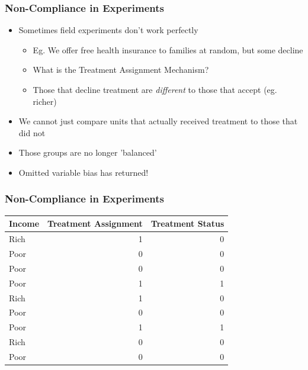 \documentclass[xcolor=x11names,compress]{beamer}\usepackage[]{graphicx}\usepackage[]{color}
\renewcommand{\(}{\begin{columns}}
\renewcommand{\)}{\end{columns}}
\newcommand{\<}[1]{\begin{column}{#1}}
\renewcommand{\>}{\end{column}}
\begin{document}
\begin{frame}
\frametitle{Non-Compliance in Experiments}
\begin{itemize}
\item Sometimes field experiments don't work perfectly
\pause
\begin{itemize}
\item Eg. We offer free health insurance to families at random, but some decline
\pause
\item What is the Treatment Assignment Mechanism?
\pause
\item Those that decline treatment are \textit{different} to those that accept (eg. richer)
\pause
\end{itemize}
\item We cannot just compare units that actually received treatment to those that did not
\pause
\item Those groups are no longer 'balanced'
\pause
\item Omitted variable bias has returned!
\end{itemize}
\end{frame}

\begin{frame}
\frametitle{Non-Compliance in Experiments}
\begin{table}[htbp]
  \centering
    \begin{tabular}{l|r|r}
    Income & \multicolumn{1}{l}{Treatment Assignment} & \multicolumn{1}{l}{Treatment Status} \\
    \hline
    Rich  & 1     & 0 \\
    Poor  & 0     & 0 \\
    Poor  & 0     & 0 \\
    Poor  & 1     & 1 \\
    Rich  & 1     & 0 \\
    Poor  & 0     & 0 \\
    Poor  & 1     & 1 \\
    Rich  & 0     & 0 \\
    Poor  & 0     & 0 \\
    \end{tabular}%
  \label{tab:addlabel}%
\end{table}%
\end{frame}
\end{document}
